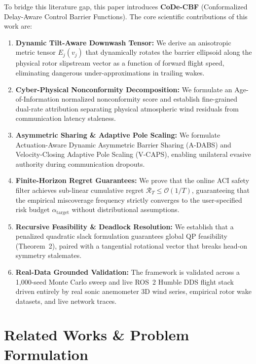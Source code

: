 \documentclass[lettersize,journal]{IEEEtran}
\begin{document}
To bridge this literature gap, this paper introduces \textbf{CoDe-CBF} (Conformalized Delay-Aware Control Barrier Functions). The core scientific contributions of this work are:
\begin{enumerate}
    \item \textbf{Dynamic Tilt-Aware Downwash Tensor:} We derive an anisotropic metric tensor $E_j(v_j)$ that dynamically rotates the barrier ellipsoid along the physical rotor slipstream vector as a function of forward flight speed, eliminating dangerous under-approximations in trailing wakes.
    \item \textbf{Cyber-Physical Nonconformity Decomposition:} We formulate an Age-of-Information normalized nonconformity score and establish fine-grained dual-rate attribution separating physical atmospheric wind residuals from communication latency staleness.
    \item \textbf{Asymmetric Sharing \& Adaptive Pole Scaling:} We formulate Actuation-Aware Dynamic Asymmetric Barrier Sharing (A-DABS) and Velocity-Closing Adaptive Pole Scaling (V-CAPS), enabling unilateral evasive authority during communication dropouts.
    \item \textbf{Finite-Horizon Regret Guarantees:} We prove that the online ACI safety filter achieves sub-linear cumulative regret $\mathcal{R}_T \le \mathcal{O}(1/T)$, guaranteeing that the empirical miscoverage frequency strictly converges to the user-specified risk budget $\alpha_{\mathrm{target}}$ without distributional assumptions.
    \item \textbf{Recursive Feasibility \& Deadlock Resolution:} We establish that a penalized quadratic slack formulation guarantees global QP feasibility (Theorem~2), paired with a tangential rotational vector that breaks head-on symmetry stalemates.
    \item \textbf{Real-Data Grounded Validation:} The framework is validated across a 1,000-seed Monte Carlo sweep and live ROS~2 Humble DDS flight stack driven entirely by real sonic anemometer 3D wind series, empirical rotor wake datasets, and live network traces.
\end{enumerate}

\section{Related Works \& Problem Formulation}
\end{document}
